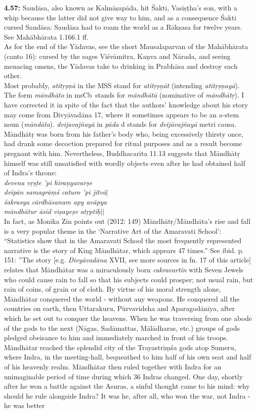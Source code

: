 \documentclass{article}
\newcommand{\vsnum}[1]{\textbf{#1}}
\newcommand{\skt}[1]{\textit{#1}}
\newcommand{\msCb}{msCb}
\begin{document}
\vsnum{4.57: }Saudāsa, also known as Kalmāṣapāda, hit Śakti, Vasiṣṭha's son, with a whip because the latter did not give way to him, and as a consequence Śakti cursed Saudāsa: Saudāsa had to roam the world as a Rākṣasa for twelve years. See Mahābhārata 1.166.1 ff. \\ As for the end of the Yādavas, see the short Mausalaparvan of the Mahābhārata (canto 16): cursed by the sages Viśvāmitra, Kaṇva and Nārada, and seeing menacing omens, the Yādavas take to drinking in Prabhāsa and destroy each other.  \\Most probably, \skt{atitṛṣṇā} in the MSS stand for \skt{atitṛṣṇāt} (intending \skt{atitṛṣṇayā}). The form \skt{māndhāto} in \msCb\ stands for \skt{māndhātā} (nominative of \skt{māndhātṛ}). I have corrected it in spite of the fact that the authors' knowledge about his story may come from Divyāvadāna 17, where it sometimes appears to be an a-stem noun (\skt{māndāta}). \skt{dvijavajñayā} in \skt{pāda} d stands for \skt{dvijāvajñayā} metri causa. \\ Māndhātṛ was born from his father's body who, being excessively thirsty once, had drank some decoction prepared for ritual purposes and as a result become pregnant with him. Nevertheless, Buddhacarita 11.13 suggests that Māndhātṛ himself was still unsatisfied with wordly objects even after he had obtained half of Indra's throne: \\ \textit{ devena vṛṣṭe 'pi hiraṇyavarṣe \\ dvīpān samagrāṃś caturo 'pi jitvā$|$\\ śakrasya cārdhāsanam apy avāpya \\ māndhātur āsīd viṣayeṣv atṛptiḥ$||$} \\ In fact, as Monika Zin points out (2012: 149) Māndhātṛ/Māndhāta's rise and fall is a very popular theme in the `Narrative Art of the Amaravati School': ``Statistics show that in the Amaravati School the most frequently represented narrative is the story of King Māndhātar, which appears 47 times.'' See ibid. p. 151: ''The story [e.g. \textit{Divyāvadāna} XVII, see more sources in fn. 17 of this article] relates that Māndhātar was a miraculously born \textit{cakravartin} with Seven Jewels who could cause rain to fall so that his subjects could prosper; not usual rain, but rain of coins, of grain or of cloth. By virtue of his moral strength alone, Māndhātar conquered the world - without any weapons. He conquered all the countries on earth, then Uttarakuru, Pūrvavideha and Aparagodānīya, after which he set out to conquer the heavens. When he was traversing from one abode of the gods to the next (Nāgas, Sadāmattas, Mālādharas, etc.) groups of gods pledged obeisance to him and immediately marched in front of his troops. Māndhātar reached the splendid city of the Trayastriṃśa gods atop Sumeru, where Indra, in the meeting-hall, bequeathed to him half of his own seat and half of his heavenly realm. Māndhātar then ruled together with Indra for an unimaginable period of time during which 36 Indras changed. One day, shortly after he won a battle against the Asuras, a sinful thought came to his mind: why should he rule alongside Indra? It was he, after all, who won the war, not Indra - he was better 
\end{document}
